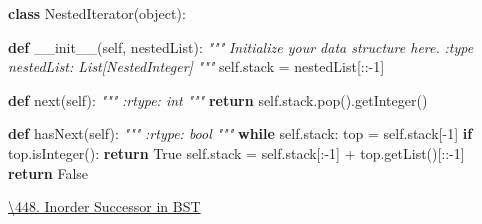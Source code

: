 \documentclass[
]{article}
\newenvironment{Shaded}{}{}
\newcommand{\BuiltInTok}[1]{#1}
\newcommand{\CommentTok}[1]{\textcolor[rgb]{0.38,0.63,0.69}{\textit{#1}}}
\newcommand{\ControlFlowTok}[1]{\textcolor[rgb]{0.00,0.44,0.13}{\textbf{#1}}}
\newcommand{\DecValTok}[1]{\textcolor[rgb]{0.25,0.63,0.44}{#1}}
\newcommand{\FunctionTok}[1]{\textcolor[rgb]{0.02,0.16,0.49}{#1}}
\newcommand{\KeywordTok}[1]{\textcolor[rgb]{0.00,0.44,0.13}{\textbf{#1}}}
\newcommand{\NormalTok}[1]{#1}
\newcommand{\OperatorTok}[1]{\textcolor[rgb]{0.40,0.40,0.40}{#1}}
\newcommand{\VariableTok}[1]{\textcolor[rgb]{0.10,0.09,0.49}{#1}}
\begin{document}
\begin{Shaded}
\begin{Highlighting}[]
\KeywordTok{class}\NormalTok{ NestedIterator(}\BuiltInTok{object}\NormalTok{):}

    \KeywordTok{def} \FunctionTok{\_\_init\_\_}\NormalTok{(}\VariableTok{self}\NormalTok{, nestedList):}
        \CommentTok{"""}
\CommentTok{        Initialize your data structure here.}
\CommentTok{        :type nestedList: List[NestedInteger]}
\CommentTok{        """}
        \VariableTok{self}\NormalTok{.stack }\OperatorTok{=}\NormalTok{ nestedList[::}\OperatorTok{{-}}\DecValTok{1}\NormalTok{]}

    \KeywordTok{def} \BuiltInTok{next}\NormalTok{(}\VariableTok{self}\NormalTok{):}
        \CommentTok{"""}
\CommentTok{        :rtype: int}
\CommentTok{        """}
        \ControlFlowTok{return} \VariableTok{self}\NormalTok{.stack.pop().getInteger()}

    \KeywordTok{def}\NormalTok{ hasNext(}\VariableTok{self}\NormalTok{):}
        \CommentTok{"""}
\CommentTok{        :rtype: bool}
\CommentTok{        """}
        \ControlFlowTok{while} \VariableTok{self}\NormalTok{.stack:}
\NormalTok{            top }\OperatorTok{=} \VariableTok{self}\NormalTok{.stack[}\OperatorTok{{-}}\DecValTok{1}\NormalTok{]}
            \ControlFlowTok{if}\NormalTok{ top.isInteger():}
                \ControlFlowTok{return} \VariableTok{True}
            \VariableTok{self}\NormalTok{.stack }\OperatorTok{=} \VariableTok{self}\NormalTok{.stack[:}\OperatorTok{{-}}\DecValTok{1}\NormalTok{] }\OperatorTok{+}\NormalTok{ top.getList()[::}\OperatorTok{{-}}\DecValTok{1}\NormalTok{]}
        \ControlFlowTok{return} \VariableTok{False}
\end{Highlighting}
\end{Shaded}

\href{https://www.lintcode.com/problem/inorder-successor-in-bst/discuss}{\textbackslash448.
Inorder Successor in BST}
\end{document}
